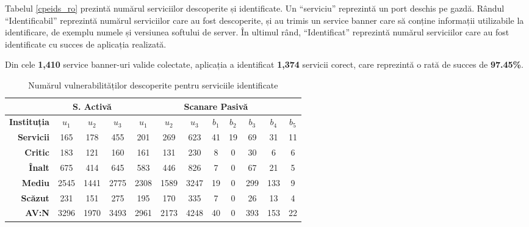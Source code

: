 	Tabelul \ref{cpeids_ro} prezintă numărul serviciilor descoperite și identificate. Un ``serviciu'' reprezintă un port deschis pe gazdă. Rândul ``Identificabil'' reprezintă numărul serviciilor care au fost descoperite, și au trimis un service banner care să conține informații utilizabile la identificare, de exemplu numele și versiunea softului de server. În ultimul rând, ``Identificat'' reprezintă numărul serviciilor care au fost identificate cu succes de aplicația realizată.
	
	Din cele \textbf{1,410} service banner-uri valide colectate, aplicația a identificat \textbf{1,374} servicii corect, care reprezintă o rată de succes de \textbf{97.45\%}.
	
	\begin{table}[H]
		\centering
		\begin{tabular}{r|ccc|ccc|ccccc|}
			\cline{2-12}
			\multicolumn{1}{l|}{}                         & \multicolumn{3}{c|}{\textbf{S. Activă}} & \multicolumn{8}{c|}{\textbf{Scanare Pasivă}}                                                             \\ \hline
			\multicolumn{1}{|r|}{\textbf{Instituția}}      & \textbf{$u_1$}    & \textbf{$u_2$}    & \textbf{$u_3$}   & \textbf{$u_1$} & \textbf{$u_2$} & \textbf{$u_3$} & \textbf{$b_1$} & \textbf{$b_2$} & \textbf{$b_3$} & \textbf{$b_4$} & \textbf{$b_5$} \\
			\multicolumn{1}{|r|}{\textbf{Servicii}} & 165            & 178            & 455           & 201         & 269         & 623         & 41          & 19          & 69          & 31          & 11          \\ \hline
			\multicolumn{1}{|r|}{\textbf{Critic}}       & 183            & 121            & 160           & 161         & 131         & 230         & 8           & 0           & 30          & 6           & 6           \\
			\multicolumn{1}{|r|}{\textbf{Înalt}}          & 675            & 414            & 645           & 583         & 446         & 826         & 7           & 0           & 67          & 21          & 5           \\
			\multicolumn{1}{|r|}{\textbf{Mediu}}        & 2545           & 1441           & 2775          & 2308        & 1589        & 3247        & 19          & 0           & 299         & 133         & 9           \\
			\multicolumn{1}{|r|}{\textbf{Scăzut}}       & 231            & 151            & 275           & 195         & 170         & 335         & 7           & 0           & 26          & 13          & 4           \\
			\multicolumn{1}{|r|}{\textbf{AV:N}}           & 3296           & 1970           & 3493          & 2961        & 2173        & 4248        & 40          & 0           & 393         & 153         & 22          \\ \hline
		\end{tabular}
		\caption{Numărul vulnerabilităților descoperite pentru serviciile identificate}
		\label{cpevulns_ro}
	\end{table}
	
